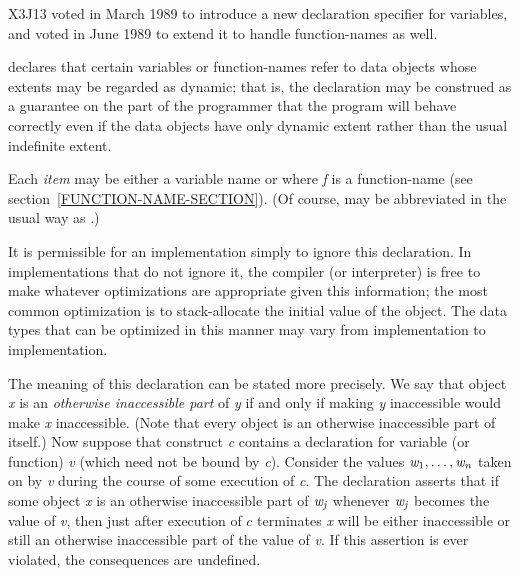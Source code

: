 \begin{newer}
X3J13 voted in March 1989  to introduce a new
declaration specifier  for variables,
and voted in June 1989 
to extend it to handle function-names as well.
\begin{flushdesc}
\item[\cdf{dynamic-extent}]

declares that certain variables or function-names refer to data objects
whose extents may be regarded as dynamic; that is, the declaration
may be construed as a guarantee on the part of the programmer that
the program will behave correctly even if the data objects have only
dynamic extent rather than the usual indefinite extent.

Each \emph{item} may be either a variable name or 
where \emph{f} is a function-name (see section~\ref{FUNCTION-NAME-SECTION}).
(Of course,  may be abbreviated in the usual way
as .)

  It is permissible for an implementation simply to ignore this declaration.
  In implementations that do not ignore it, the compiler (or interpreter)
  is free to make whatever optimizations are appropriate given this
  information; the most common optimization is to stack-allocate the
  initial value of the object. The data types that can be optimized in this manner
  may vary from implementation to implementation.

The meaning of this declaration can be stated more precisely.
We say that
object \emph{x} is an \emph{otherwise inaccessible part}
    of \emph{y} if and only if making \emph{y} inaccessible would make \emph{x} inaccessible.
    (Note that every object is an otherwise inaccessible part of itself.)
  Now suppose that construct \emph{c} contains a  declaration for
  variable (or function) \emph{v} (which need not be bound by \emph{c}).  Consider the values
  $\emph{w}_1, \ldots, \emph{w}_{\hbox{\scriptsize\it n}}$ taken on by \emph{v} during the course of some execution of
  \emph{c}.  The declaration asserts that if some object \emph{x}
  is an otherwise inaccessible part of $\emph{w}_{\hbox{\scriptsize\it j}}$
  whenever $\emph{w}_{\hbox{\scriptsize\it j}}$ becomes the value of \emph{v},
  then just after execution of
  $c$ terminates \emph{x} will be either inaccessible or
  still an otherwise inaccessible part of the value of \emph{v}.
  If this assertion is ever violated, the consequences are undefined.


\end{flushdesc}
\end{newer}
